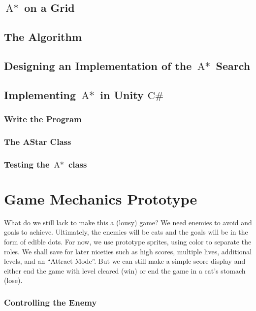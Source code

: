 \documentclass[12pt]{amsbook}
\theoremstyle{definition}
\theoremstyle{remark}
\numberwithin{figure}{chapter}
\numberwithin{table}{chapter}
\numberwithin{section}{chapter}
\numberwithin{equation}{section}
\newcommand{\csharp}{\ensuremath{\mbox{C}\#}\xspace}
\newcommand{\astar}{\ensuremath{\mbox{A}*}\xspace}
\begin{document}
\section{\astar on a Grid}

\section{The Algorithm}

\section{Designing an Implementation of the \astar Search}


\section{Implementing \astar in Unity \csharp}

\subsection{Write the Program}


\subsection{The AStar Class}

\subsection{Testing the \astar class}

\chapter{Game Mechanics Prototype}

What do we still lack to make this a (lousy) game? We need enemies to avoid and goals to achieve.  Ultimately, the enemies will be cats and the goals will be in the form of edible dots.  For now, we use prototype sprites, using color to separate the roles.  We shall save for later niceties such as high scores, multiple lives, additional levels, and an “Attract Mode”.  But we can still make a simple score display and either end the game with level cleared (win) or end the game in a cat’s stomach (lose).

\subsection{Controlling the Enemy}
\end{document}
